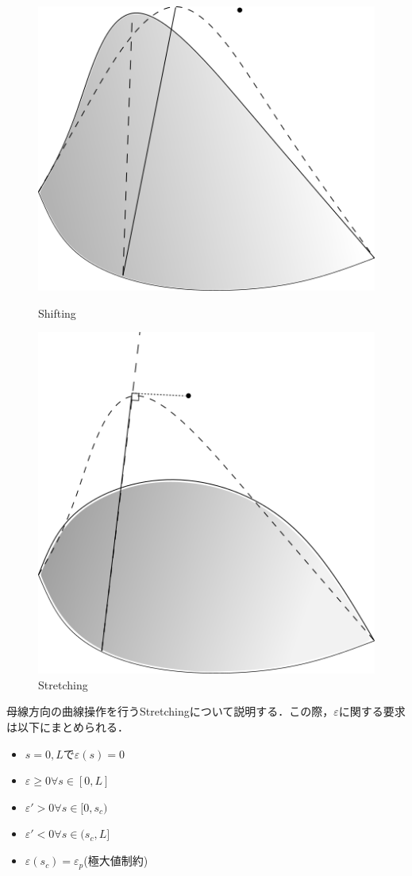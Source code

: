 \documentclass[16.7pt]{jsarticle}
\begin{document}
		\begin{figure}[h]
			\centering
			\begin{minipage}{0.4\hsize}
				\centering
				\includegraphics[width= 0.6\columnwidth]{./figure/Shifting.png}
				\caption{Shifting}
			\end{minipage}
			\begin{minipage}{0.4\hsize}
				\centering
				\includegraphics[width= 0.6\columnwidth]{./figure/Stretching.png}
				\caption{Stretching}
			\end{minipage}
		\end{figure}
		母線方向の曲線操作を行うStretchingについて説明する．この際，$ \varepsilon $に関する要求は以下にまとめられる．
		\begin{itemize}
			\item $ s=0,L $で$ \varepsilon(s) = 0 $
			\item $ \varepsilon \geq 0 \forall s \in [0,L]$
			\item $ \varepsilon'>0 \forall s \in [ 0,s_c ) $
			\item $ \varepsilon'<0 \forall s \in ( s_c ,L] $
			\item $ \varepsilon(s_c) = \varepsilon_p $(極大値制約)
		\end{itemize}
\end{document}
